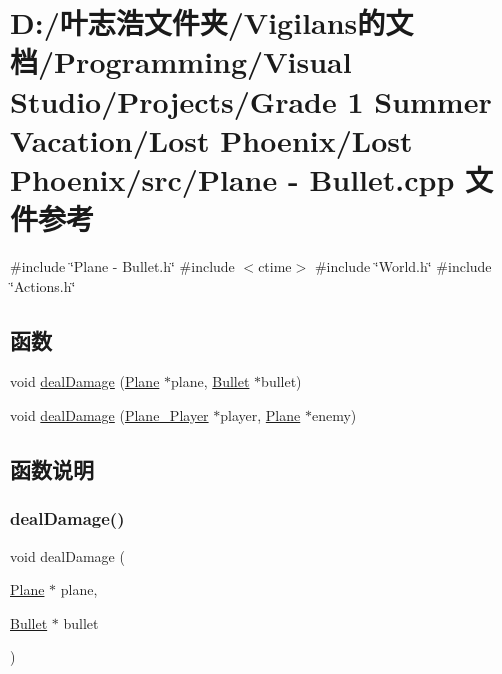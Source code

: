 \hypertarget{_plane_01-_01_bullet_8cpp}{}\section{D\+:/叶志浩文件夹/\+Vigilans的文档/\+Programming/\+Visual Studio/\+Projects/\+Grade 1 Summer Vacation/\+Lost Phoenix/\+Lost Phoenix/src/\+Plane -\/ Bullet.\+cpp 文件参考}
\label{_plane_01-_01_bullet_8cpp}
{\ttfamily \#include \char`\"{}Plane -\/ Bullet.\+h\char`\"{}}\newline
{\ttfamily \#include $<$ctime$>$}\newline
{\ttfamily \#include \char`\"{}World.\+h\char`\"{}}\newline
{\ttfamily \#include \char`\"{}Actions.\+h\char`\"{}}\newline
\subsection*{函数}
\begin{DoxyCompactItemize}
\item 
void \hyperlink{_plane_01-_01_bullet_8cpp_a62df33be634d89b2428bc84d98761bb7}{deal\+Damage} (\hyperlink{class_plane}{Plane} $\ast$plane, \hyperlink{class_bullet}{Bullet} $\ast$bullet)
\item 
void \hyperlink{_plane_01-_01_bullet_8cpp_ab0e76936bbaa057d4f15ddf206b75b91}{deal\+Damage} (\hyperlink{class_plane___player}{Plane\+\_\+\+Player} $\ast$player, \hyperlink{class_plane}{Plane} $\ast$enemy)
\end{DoxyCompactItemize}


\subsection{函数说明}
\mbox{\label{_plane_01-_01_bullet_8cpp_a62df33be634d89b2428bc84d98761bb7}} 
\subsubsection{\texorpdfstring{deal\+Damage()}{dealDamage()}\hspace{0.1cm}{\footnotesize\ttfamily [1/2]}}
{\footnotesize\ttfamily void deal\+Damage (\begin{DoxyParamCaption}\item[{\hyperlink{class_plane}{Plane} $\ast$}]{plane,  }\item[{\hyperlink{class_bullet}{Bullet} $\ast$}]{bullet }\end{DoxyParamCaption})}

